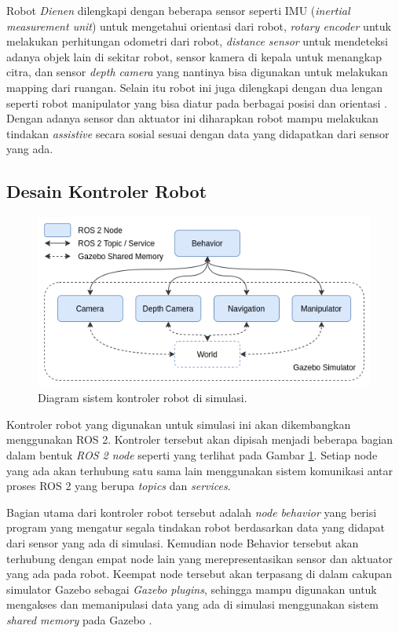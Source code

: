 Robot \emph{Dienen} dilengkapi dengan beberapa sensor seperti IMU (\emph{inertial measurement unit}) untuk mengetahui orientasi dari robot, \emph{rotary encoder} untuk melakukan perhitungan odometri dari robot, \emph{distance sensor} untuk mendeteksi adanya objek lain di sekitar robot, sensor kamera di kepala untuk menangkap citra, dan sensor \emph{depth camera} yang nantinya bisa digunakan untuk melakukan mapping dari ruangan.
Selain itu robot ini juga dilengkapi dengan dua lengan seperti robot manipulator yang bisa diatur pada berbagai posisi dan orientasi \citep{iqbal2012}.
Dengan adanya sensor dan aktuator ini diharapkan robot mampu melakukan tindakan \emph{assistive} secara sosial sesuai dengan data yang didapatkan dari sensor yang ada.

\subsection{Desain Kontroler Robot}

\begin{figure} [ht]
  \centering
  \includegraphics[scale=0.45]{gambar/kontrolersimulasi.png}
  \caption{Diagram sistem kontroler robot di simulasi.}
  \label{fig:kontrolersimulasi}
\end{figure}

Kontroler robot yang digunakan untuk simulasi ini akan dikembangkan menggunakan ROS 2.
Kontroler tersebut akan dipisah menjadi beberapa bagian dalam bentuk \emph{ROS 2 node} seperti yang terlihat pada Gambar \ref{fig:kontrolersimulasi}.
Setiap node yang ada akan terhubung satu sama lain menggunakan sistem komunikasi antar proses ROS 2 yang berupa \emph{topics} dan \emph{services}.

Bagian utama dari kontroler robot tersebut adalah \emph{node behavior} yang berisi program yang mengatur segala tindakan robot berdasarkan data yang didapat dari sensor yang ada di simulasi.
Kemudian node Behavior tersebut akan terhubung dengan empat node lain yang merepresentasikan sensor dan aktuator yang ada pada robot.
Keempat node tersebut akan terpasang di dalam cakupan simulator Gazebo sebagai \emph{Gazebo plugins}, sehingga mampu digunakan untuk mengakses dan memanipulasi data yang ada di simulasi menggunakan sistem \emph{shared memory} pada Gazebo \citep{gazeboplugins}.

